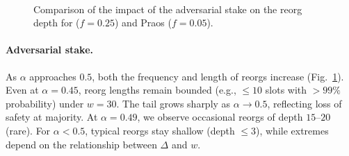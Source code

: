 \begin{figure}[htbp!]
\\
\caption{Comparison of the impact of the adversarial stake on the reorg depth for \ProjBase ($f=0.25$) and Praos ($f=0.05$).}
\label{fig:adversarial}
\end{figure}

\paragraph{Adversarial stake.}
As $\alpha$ approaches $0.5$, both the frequency and length of reorgs increase (Fig.~\ref{fig:adversarial}). Even at $\alpha=0.45$, reorg lengths remain bounded (e.g., $\le 10$ slots with $>99\%$ probability) under $w=30$. The tail grows sharply as $\alpha\to 0.5$, reflecting loss of safety at majority. At $\alpha=0.49$, we observe occasional reorgs of depth $15$--$20$ (rare). For $\alpha<0.5$, typical reorgs stay shallow (depth $\le 3$), while extremes depend on the relationship between $\Delta$ and $w$.


